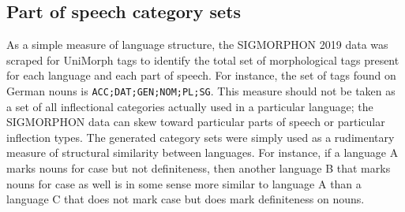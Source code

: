 \subsection{Part of speech category sets}

As a simple measure of language structure, the SIGMORPHON 2019 data was scraped for UniMorph tags to identify the total set of morphological tags present for each language and each part of speech. For instance, the set of tags found on German nouns is \texttt{ACC;DAT;GEN;NOM;PL;SG}. This measure should not be taken as a set of all inflectional categories actually used in a particular language; the SIGMORPHON data can skew toward particular parts of speech or particular inflection types. The generated category sets were simply used as a rudimentary measure of structural similarity between languages. For instance, if a language A marks nouns for case but not definiteness, then another language B that marks nouns for case as well is in some sense more similar to language A than a language C that does not mark case but does mark definiteness on nouns.